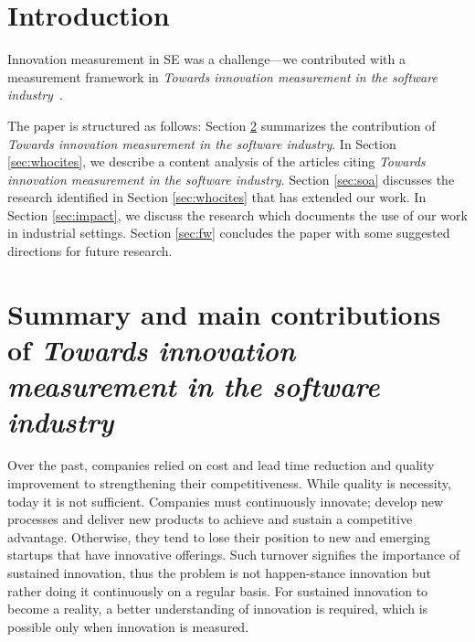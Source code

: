 \documentclass[sigplan]{acmart}
\newcommand{\theArticle}{\textit{Towards innovation measurement in the software industry}}
\begin{document}



\maketitle


\section{Introduction}\label{sec:intro}
Innovation measurement in SE was a challenge---we contributed with a measurement framework in \theArticle~\cite{EdisonAT13}. 

The paper is structured as follows: Section \ref{sec:sumpaper} summarizes the contribution of \theArticle. In Section \ref{sec:whocites}, we describe a content analysis of the articles citing \theArticle. Section \ref{sec:soa} discusses the research identified in Section \ref{sec:whocites} that has extended our work. In Section \ref{sec:impact}, we discuss the research which documents the use of our work in industrial settings. Section \ref{sec:fw} concludes the paper with some suggested directions for future research.

\section{Summary and main contributions of \theArticle}
\label{sec:sumpaper}
Over the past, companies relied on cost and lead time reduction and quality improvement to strengthening their competitiveness. While quality is necessity, today it is not sufficient. Companies must continuously innovate; develop new processes and deliver new products to achieve and sustain a competitive advantage. Otherwise, they tend to lose their position to new and emerging startups that have innovative offerings. Such turnover signifies the importance of sustained innovation, thus the problem is not happen-stance innovation but rather doing it continuously on a regular basis. For sustained innovation to become a reality, a better understanding of innovation is required, which is possible only when innovation is measured.
\end{document}
